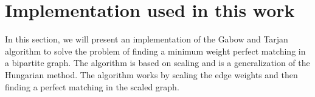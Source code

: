 \section{Implementation used in this work}
In this section, we will present an implementation of the Gabow and Tarjan algorithm to solve the problem of finding a minimum weight perfect matching in a bipartite graph. The algorithm is based on scaling and is a generalization of the Hungarian method. The algorithm works by scaling the edge weights and then finding a perfect matching in the scaled graph. 
